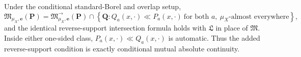 Under the conditional standard-Borel and overlap setup,
\[
\mathfrak M_{\mu_X,\boldsymbol e}(\boldsymbol P)
=\mathfrak M^{\to}_{\mu_X,\boldsymbol e}(\boldsymbol P)
\cap\left\{\boldsymbol Q:Q_a(x,\cdot)\ll P_a(x,\cdot)\ \text{for both }a,\ \mu_X\text{-almost everywhere}\right\},
\]
and the identical reverse-support intersection formula holds with \(\mathfrak L\) in place of \(\mathfrak M\).  Inside either one-sided class, \(P_a(x,\cdot)\ll Q_a(x,\cdot)\) is automatic.  Thus the added reverse-support condition is exactly conditional mutual absolute continuity.